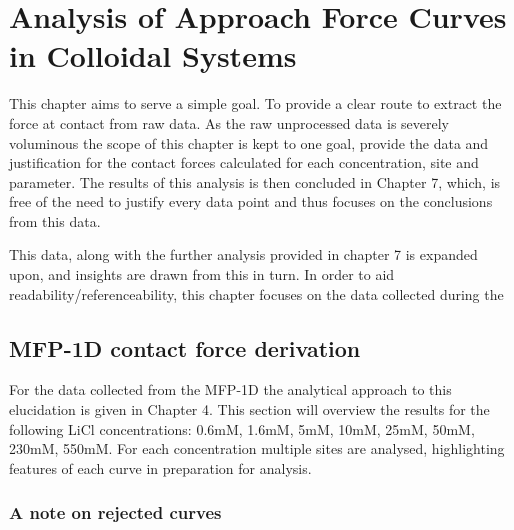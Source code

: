 


\chapter{Analysis of Approach Force Curves in Colloidal Systems}
\label{chap:approach_force_curves}

This chapter aims to serve a simple goal. To provide a clear route to extract the force at contact from raw data.  As the raw unprocessed data is severely voluminous the scope of this chapter is kept to one goal, provide the data and justification for the contact forces calculated for each concentration, site and parameter. The results of this analysis is then concluded in Chapter 7, which, is free of the need to justify every data point and thus focuses on the conclusions from this data. 

This data, along with the further analysis provided in chapter 7 is expanded upon, and insights are drawn from this in turn. In order to aid readability/referenceability, this chapter focuses on the data collected during the 

\section{MFP-1D contact force derivation}

For the data collected from the MFP-1D the analytical approach to this elucidation is given in Chapter 4. This section will overview the results for the following LiCl concentrations: 0.6mM, 1.6mM, 5mM, 10mM, 25mM, 50mM, 230mM, 550mM. For each concentration multiple sites are analysed, highlighting features of each curve in preparation for analysis. 

\subsection{A note on rejected curves}

